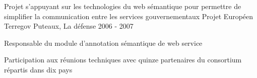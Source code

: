 \begin{cventries}
  \cventry
    {Projet s'appuyant sur les technologies du web sémantique pour permettre de simplifier la communication entre les services gouvernementaux} %
    {Projet Européen Terregov} %
    {Puteaux, La défense} %
    {2006 - 2007} %
    {
      \begin{cvitems} %
        \item {Responsable du module d'annotation sémantique de web service}
        \item {Participation aux réunions techniques avec quinze partenaires du consortium répartis dans dix pays}
      \end{cvitems}
    }

\end{cventries}
